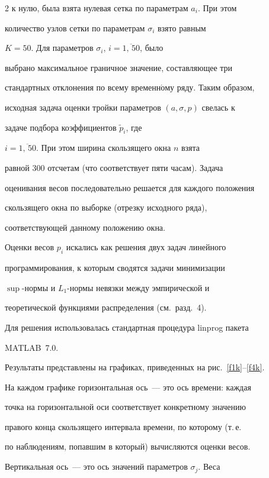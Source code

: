 \begin{multicols}{2}
к нулю, была взята нулевая сетка по параметрам $a_{i}$. При этом


количество узлов сетки по параметрам $\sigma_{i}$ взято равным


$K=50$. Для параметров $\sigma_{i}$, $i=\overline{1,\,50}$, было


выбрано максимальное граничное значение, составляющее три


стандартных отклонения по всему временн$\acute{\mbox{о}}$му ряду. Таким образом,


исходная задача оценки тройки параметров $(a,\sigma,p)$ свелась к


задаче подбора коэффициентов $\tilde p_{i}$, где


$i=\overline{1,\,50}$. При этом ширина скользящего окна $n$ взята


равной $300$ отсчетам (что соответствует пяти часам). Задача


оценивания весов последовательно решается для каждого положения


скользящего окна по выборке (отрезку исходного ряда),


соответствующей данному положению окна.





Оценки весов $p_i$ искались как решения двух задач линейного


программирования, к которым сводятся задачи минимизации


$\sup$-нормы и $L_1$-нор\-мы невязки между эмпирической и


теоретической функциями распределения (см.\ разд.~4).





Для решения использовалась стандартная процедура {\sf linprog} пакета


MATLAB~7.0.





Результаты представлены на графиках, приведенных на рис.~\ref{f1k}--\ref{f4k}.


На каждом графике горизонтальная ось~--- это ось времени: каждая


точка на горизонтальной оси соответствует конкретному значению


правого конца скользящего интервала времени, по которому (т.\,е.\


по наблюдениям, попавшим в который) вычисляются оценки весов.


Вертикальная ось~--- это ось значений параметров $\sigma_j$. Веса



\end{multicols}
